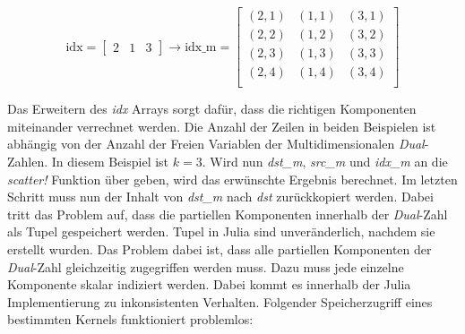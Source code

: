 \begin{equation}
\text{idx}= 
\begin{bmatrix}
 2 & 1 & 3
\end{bmatrix}
\rightarrow
\text{idx\_m} = 
\begin{bmatrix}
 (2, 1) & (1, 1) & (3, 1) \\ 
 (2, 2) & (1, 2) & (3, 2) \\
 (2, 3) & (1, 3) & (3, 3) \\
 (2, 4) & (1, 4) & (3, 4) \\
\end{bmatrix}
\end{equation}

Das Erweitern des \textit{idx} Arrays sorgt dafür, dass die richtigen Komponenten miteinander verrechnet werden.
Die Anzahl der Zeilen in beiden Beispielen ist abhängig von der Anzahl der Freien Variablen  
der Multidimensionalen \textit{Dual}-Zahlen. In diesem Beispiel ist $k = 3$.
Wird nun \textit{dst\_m}, \textit{src\_m} und \textit{idx\_m} an die \textit{scatter!} Funktion über
geben, wird das erwünschte Ergebnis berechnet. 
Im letzten Schritt muss nun der Inhalt von \textit{dst\_m} nach \textit{dst} zurückkopiert werden.
Dabei tritt das Problem auf, dass die partiellen Komponenten innerhalb der \textit{Dual}-Zahl
als Tupel gespeichert werden.
Tupel in Julia sind unveränderlich, nachdem sie erstellt wurden.
Das Problem dabei ist, dass alle partiellen Komponenten der \textit{Dual}-Zahl gleichzeitig zugegriffen werden muss.
Dazu muss jede einzelne Komponente skalar indiziert werden.
Dabei kommt es innerhalb der Julia Implementierung zu inkonsistenten Verhalten.
Folgender Speicherzugriff eines bestimmten Kernels funktioniert problemlos:


